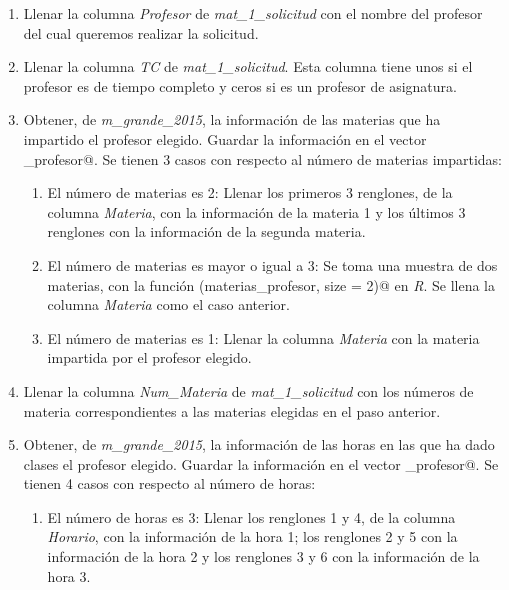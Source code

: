\begin{enumerate}

\item Llenar la columna \textit{Profesor} de \textit{mat\_1\_solicitud} con el nombre del profesor del cual queremos realizar la solicitud.

\item Llenar la columna \textit{TC} de \textit{mat\_1\_solicitud}. Esta columna tiene unos si el profesor es de tiempo completo y ceros si es un profesor de asignatura.

\item Obtener, de \textit{m\_grande\_2015}, la información de las materias que ha impartido el profesor elegido. Guardar la información en el vector \verb@materias_profesor@. Se tienen 3 casos con respecto al número de materias impartidas:

\begin{enumerate}
\item El número de materias es 2: Llenar los primeros 3 renglones, de la columna \textit{Materia}, con la información de la materia 1 y los últimos 3 renglones con la información de la segunda materia.

\item El número de materias es mayor o igual a 3: Se toma una muestra de dos materias, con la función \verb@sample(materias_profesor, size = 2)@ en \textit{R}. Se llena la columna \textit{Materia} como el caso anterior.

\item El número de materias es 1: Llenar la columna \textit{Materia} con la materia impartida por el profesor elegido.
\end{enumerate}

\item Llenar la columna \textit{Num\_Materia} de \textit{mat\_1\_solicitud} con los números de materia correspondientes a las materias elegidas en el paso anterior.

\item Obtener, de \textit{m\_grande\_2015}, la información de las horas en las que ha dado clases el profesor elegido. Guardar la información en el vector \verb@horas_profesor@. Se tienen 4 casos con respecto al número de horas:

\begin{enumerate}
\item El número de horas es 3: Llenar los renglones 1 y 4, de la columna \textit{Horario}, con la información de la hora 1; los renglones 2 y 5 con la información de la hora 2 y los renglones 3 y 6 con la información de la hora 3.


\end{enumerate}
\end{enumerate}
